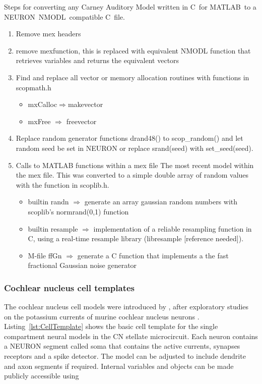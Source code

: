 
Steps for converting any Carney Auditory Model written in C~for MATLAB~to a NEURON~NMODL~compatible C~file.
\begin{enumerate}
\item Remove mex headers
\item remove \textsf{mexfunction}, this is replaced with equivalent NMODL function that retrieves variables and returns the equivalent vectors
\item Find and replace all vector or memory allocation routines with functions in scopmath.h
  \begin{itemize}
  \item \textsf{mxCalloc}$\Rightarrow$\textsf{makevector}
  \item \textsf{mxFree} $\Rightarrow$ \textsf{freevector}
  \end{itemize}
\item Replace random generator functions \textsf{drand48()} to \mbox{\textsf{scop\_random()}} and let random seed be set in NEURON or replace \textsf{srand(seed)} with \mbox{\textsf{set\_seed(seed)}}.
\item Calls to MATLAB functions within a mex file The most recent model within the mex file.  This was converted to a simple double array of random values with the  function in \mbox{\textsf{scoplib.h}}.
  \begin{itemize}
  \item builtin \textsf{randn} $\Rightarrow$ generate an array gaussian random numbers with scoplib's \mbox{\textsf{normrand(0,1)}} function
  \item builtin \textsf{resample} $\Rightarrow$ implementation of a reliable resampling function in C, using a real-time resample library (libresample [reference needed]).
  \item M-file \textsf{ffGn} $\Rightarrow$ generate a C function that implements a the fast fractional Gaussian noise generator
  \end{itemize}
\end{enumerate}

\subsubsection[CN cells]{Cochlear nucleus cell templates    \label{sec:APDX:Cell_templates}}

The cochlear nucleus cell models were introduced by \citet{RothmanManis:2003b}, after exploratory studies on the potassium currents of murine cochlear nucleus neurons \citep{RothmanManis:2003,RothmanManis:2003a}.
Listing~\ref{lst:CellTemplate} shows the basic cell template for the single compartment neural models in the CN stellate microcircuit.
Each neuron contains a NEURON segment called soma that contains the active currents, synapses receptors and a spike detector. The model can be adjusted to include dendrite and axon segments if required.
Internal variables and objects can be made publicly accessible using


